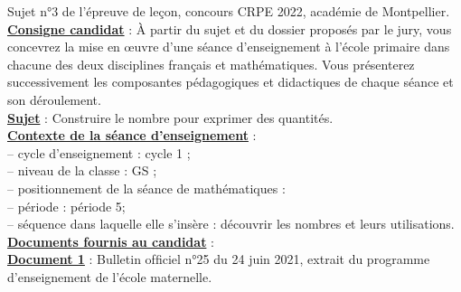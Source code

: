 \activites

\textcolor{G1}{Sujet n°3 de l'épreuve de leçon, concours CRPE 2022, académie de Montpellier.} \\

{\bf\uline{Consigne candidat}} : À partir du sujet et du dossier proposés par le jury, vous concevrez la mise en œuvre d'une séance d'enseignement à l'école primaire dans chacune des deux disciplines français et mathématiques. Vous présenterez successivement les composantes pédagogiques et didactiques de chaque séance et son déroulement. \\

{\bf\uline{Sujet}} : Construire le nombre pour exprimer des quantités. \\

{\bf\uline{Contexte de la séance d'enseignement}} : \\
   \hspace*{5mm} -- cycle d'enseignement : cycle 1 ; \\
   \hspace*{5mm} -- niveau de la classe : GS ; \\
   \hspace*{5mm} -- positionnement de la séance de mathématiques : \\
      \hspace*{10mm} -- période : période 5; \\
      \hspace*{10mm} -- séquence dans laquelle elle s'insère : découvrir les nombres et leurs utilisations. \\ [5mm]

{\bf\uline{Documents fournis au candidat}} : \\

{\bf\uline{Document 1}} : Bulletin ofﬁciel n°25 du 24 juin 2021, extrait du programme d'enseignement de l'école maternelle. 

